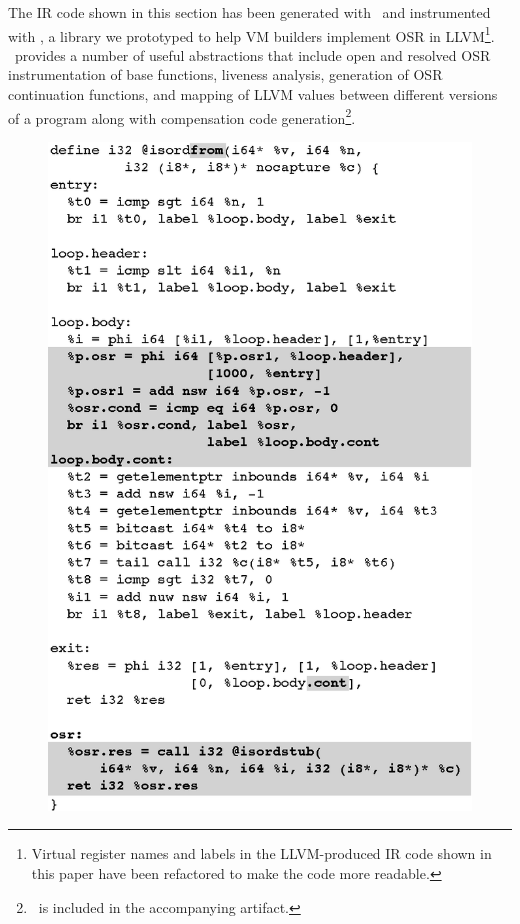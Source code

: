 The IR code shown in this section has been generated with \clang\ and instrumented with \osrkit, a library we prototyped to help VM builders implement OSR in LLVM\footnote{Virtual register names and labels in the LLVM-produced IR code shown in this paper have been refactored to make the code more readable.}. \osrkit\ provides a number of useful abstractions that include open and resolved OSR instrumentation of base functions, liveness analysis, generation of OSR continuation functions, and mapping of LLVM values between different versions of a program along with compensation code generation\footnote{\osrkit\ is included in the accompanying artifact.}.


\ifdefined\noauthorea
\begin{figure}[t]
\begin{center}
\includegraphics[width=0.9\columnwidth]{figures/isordfrom/isordfrom.eps}
\caption{\protect}
\end{center}
\end{figure}
\fi

